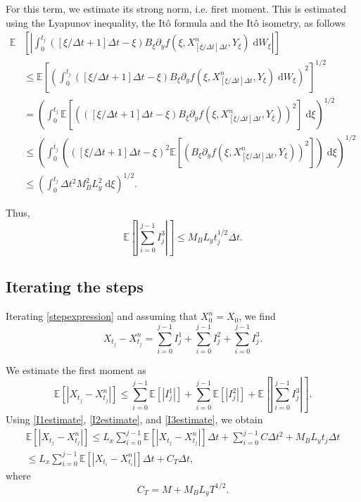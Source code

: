 \documentclass[reqno,12pt]{amsart}
\theoremstyle{plain}%
\theoremstyle{definition}
\begin{document}
For this term, we estimate its strong norm, i.e. first moment. This is estimated using the Lyapunov inequality, the It\^o formula and the It\^o isometry, as follows
\begin{align*}
  \mathbb{E}&\left[ \left| \int_0^{t_j} \left([\xi/\Delta t + 1]\Delta t - \xi\right) B_\xi \partial_y f(\xi, X_{[\xi/\Delta t]\Delta t}^n, Y_\xi) \;\mathrm{d}W_\xi\right| \right] \\
   & \leq \mathbb{E}\left[ \left( \int_0^{t_j} \left([\xi/\Delta t + 1]\Delta t - \xi\right) B_\xi \partial_y f(\xi, X_{[\xi/\Delta t]\Delta t}^n, Y_\xi)\;\mathrm{d}W_\xi \right)^2 \right]^{1/2} \\
   & =  \left(\int_0^{t_j} \mathbb{E}\left[ \left(\left([\xi/\Delta t + 1]\Delta t - \xi\right) B_\xi \partial_y f(\xi, X_{[\xi/\Delta t]\Delta t}^n, Y_\xi)\right)^2 \right]\;\mathrm{d}\xi \right)^{1/2}\\
   & \leq \left(\int_0^{t_j} \left(\left([\xi/\Delta t + 1]\Delta t - \xi\right)^2\mathbb{E}\left[ \left( B_\xi \partial_y f(\xi, X_{[\xi/\Delta t]\Delta t}^n, Y_\xi)\right)^2 \right]\right) \;\mathrm{d}\xi \right)^{1/2}\\
   & \leq \left(\int_0^{t_j} \Delta t^2 M_B^2 L_y^2 \;\mathrm{d}\xi \right)^{1/2}.
\end{align*}

Thus,
\begin{equation}
  \label{I3estimate}
  \mathbb{E}\left[ \left| \sum_{i=0}^{j-1} I_j^3 \right| \right] \leq M_B L_y t_j^{1/2} \Delta t.
\end{equation}

\subsection{Iterating the steps}

Iterating \eqref{stepexpression} and assuming that $X_0^n = X_0$, we find
\begin{equation}
  \label{iteratedexpression}
  X_{t_j} - X_{t_j}^n = \sum_{i=0}^{j-1} I_j^1 + \sum_{i=0}^{j-1} I_j^2 + \sum_{i=0}^{j-1} I_j^3.
\end{equation}

We estimate the first moment as
\begin{equation}
 \mathbb{E}\left[| X_{t_j} - X_{t_j}^n |\right] \leq \sum_{i=0}^{j-1} \mathbb{E}\left[| I_j^1|\right] + \sum_{i=0}^{j-1} \mathbb{E}\left[|I_j^2 |\right] + \mathbb{E}\left[ \left| \sum_{i=0}^{j-1} I_j^3 \right| \right].
\end{equation}
Using \eqref{I1estimate}, \eqref{I2estimate}, and \eqref{I3estimate}, we obtain
\begin{multline}
\label{iteratedestimate}
 \mathbb{E}\left[| X_{t_j} - X_{t_j}^n |\right] \leq L_x \sum_{i=0}^{j-1} \mathbb{E}\left[|X_{t_j} - X_{t_j}^n|\right]\Delta t + \sum_{i=0}^{j-1} C\Delta t^2 + M_B L_y t_j \Delta t \\
 \leq L_x \sum_{i=0}^{j-1} \mathbb{E}\left[|X_{t_i} - X_{t_i}^n|\right]\Delta t + C_T \Delta t,
\end{multline}
where
$$
C_T = M + M_B L_yT^{1/2}.
$$
\end{document}
